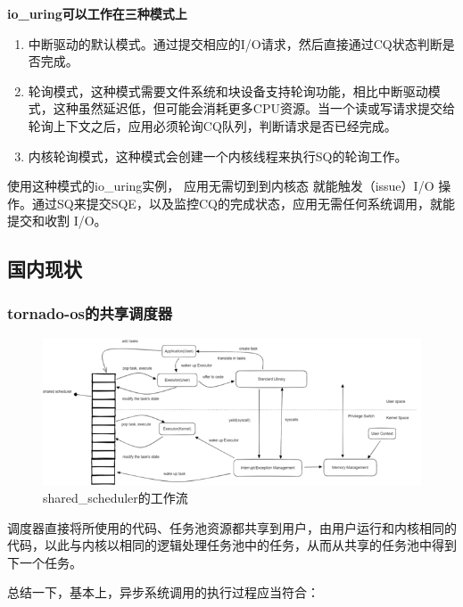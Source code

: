\textbf{io\_uring可以工作在三种模式上}

\begin{enumerate}
\item 中断驱动的默认模式。通过提交相应的I/O请求，然后直接通过CQ状态判断是否完成。
\item 轮询模式，这种模式需要文件系统和块设备支持轮询功能，相比中断驱动模式，这种虽然延迟低，但可能会消耗更多CPU资源。当一个读或写请求提交给轮询上下文之后，应用必须轮询CQ队列，判断请求是否已经完成。
\item 内核轮询模式，这种模式会创建一个内核线程来执行SQ的轮询工作。
\end{enumerate}


使用这种模式的io\_uring实例， 应用无需切到到内核态 就能触发（issue）I/O 操作。通过SQ来提交SQE，以及监控CQ的完成状态，应用无需任何系统调用，就能提交和收割 I/O。


\subsection{国内现状}

\subsubsection{tornado-os的共享调度器}

\begin{figure}[htb]
    \figureCapSet
    \centering
    \includegraphics[width=.8\linewidth]{figure/c1/sharedscheduler.png}
    \caption{shared\_scheduler的工作流}
    \label{figure:c1sharedscheduler}
\end{figure}

调度器直接将所使用的代码、任务池资源都共享到用户，由用户运行和内核相同的代码，以此与内核以相同的逻辑处理任务池中的任务，从而从共享的任务池中得到下一个任务。

总结一下，基本上，异步系统调用的执行过程应当符合：


